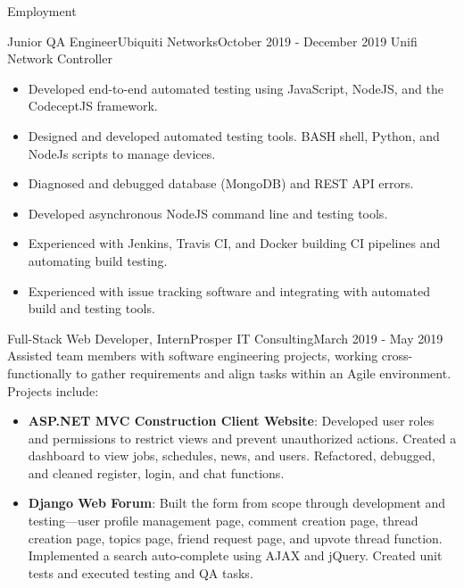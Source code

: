 \documentclass[]{mcdowellcv}
\begin{document}
	\makeheader
	
	\begin{cvsection}{Employment}
		\begin{cvsubsection}{Junior QA Engineer}{Ubiquiti Networks}{October 2019 - December 2019}
			Unifi Network Controller
			\begin{itemize}
				\item Developed end-to-end automated testing using JavaScript, NodeJS, and the CodeceptJS framework.
				\item Designed and developed automated testing tools. BASH shell, Python, and NodeJs scripts to manage devices.
				\item Diagnosed and debugged database (MongoDB) and REST API errors.
				\item Developed asynchronous NodeJS command line and testing tools.
				\item Experienced with Jenkins, Travis CI, and Docker building CI pipelines and automating build testing.
				\item Experienced with issue tracking software and integrating with automated build and testing tools.
			\end{itemize}
		\end{cvsubsection}
		
		\begin{cvsubsection}{Full-Stack Web Developer, Intern}{Prosper IT Consulting}{March 2019 - May 2019}	
			Assisted team members with software engineering projects, working cross-functionally to gather requirements and align tasks within an Agile environment. Projects include:
			\begin{itemize}
				\item \textbf{ASP.NET MVC Construction Client Website}: Developed user roles and permissions to restrict views and prevent unauthorized actions. Created a dashboard to view jobs, schedules, news, and users. Refactored, debugged, and cleaned register, login, and chat functions.
				\item \textbf{Django Web Forum}: Built the form from scope through development and testing—user profile management page, comment creation page, thread creation page, topics page, friend request page, and upvote thread function. Implemented a search auto-complete using AJAX and jQuery. Created unit tests and executed testing and QA tasks.
			\end{itemize}
		\end{cvsubsection}
		

\end{cvsection}
\end{document}
